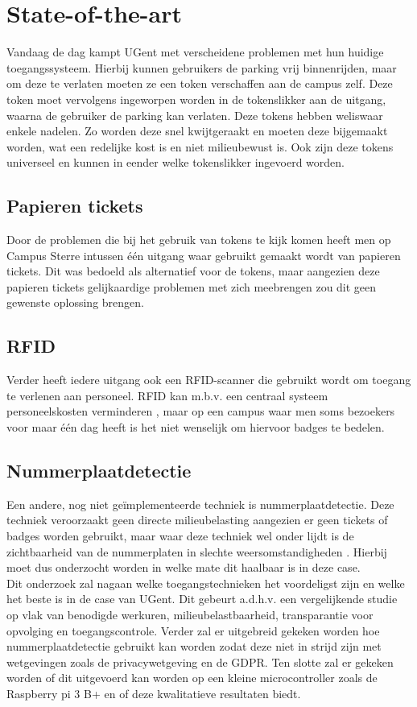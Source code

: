 
\section{State-of-the-art}
\label{sec:state-of-the-art}

Vandaag de dag kampt UGent met verscheidene problemen met hun huidige toegangssysteem. Hierbij kunnen gebruikers de parking vrij binnenrijden, maar om deze te verlaten moeten ze een token verschaffen aan de campus zelf. Deze token moet vervolgens ingeworpen worden in de tokenslikker aan de uitgang, waarna de gebruiker de parking kan verlaten. Deze tokens hebben weliswaar enkele nadelen. Zo worden deze snel kwijtgeraakt en moeten deze bijgemaakt worden, wat een redelijke kost is en niet milieubewust is. Ook zijn deze tokens universeel en kunnen in eender welke tokenslikker ingevoerd worden.
\subsection{Papieren tickets}
Door de problemen die bij het gebruik van tokens te kijk komen heeft men op Campus Sterre intussen één uitgang waar gebruikt gemaakt wordt van papieren tickets. Dit was bedoeld als alternatief voor de tokens, maar aangezien deze papieren tickets gelijkaardige problemen met zich meebrengen zou dit geen gewenste oplossing brengen.
\subsection{RFID}
Verder heeft iedere uitgang ook een RFID-scanner die gebruikt wordt om toegang te verlenen aan personeel. RFID kan m.b.v. een centraal systeem personeelskosten verminderen \autocite{pala2007smart}, maar op een campus waar men soms bezoekers voor maar één dag heeft is het niet wenselijk om hiervoor badges te bedelen.
\subsection{Nummerplaatdetectie}
Een andere, nog niet geïmplementeerde techniek is nummerplaatdetectie. Deze techniek veroorzaakt geen directe milieubelasting aangezien er geen tickets of badges worden gebruikt, maar waar deze techniek wel onder lijdt is de zichtbaarheid van de nummerplaten in slechte weersomstandigheden \autocite{azam2016automatic}. Hierbij moet dus onderzocht worden in welke mate dit haalbaar is in deze case.
\\
Dit onderzoek zal nagaan welke toegangstechnieken het voordeligst zijn en welke het beste is in de case van UGent. Dit gebeurt a.d.h.v. een vergelijkende studie op vlak van benodigde werkuren, milieubelastbaarheid, transparantie voor opvolging en toegangscontrole. Verder zal er uitgebreid gekeken worden hoe nummerplaatdetectie gebruikt kan worden zodat deze niet in strijd zijn met wetgevingen zoals de privacywetgeving en de GDPR. Ten slotte zal er gekeken worden of dit uitgevoerd kan worden op een kleine microcontroller zoals de Raspberry pi 3 B+ en of deze kwalitatieve resultaten biedt.

